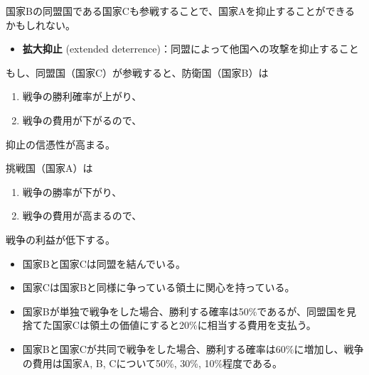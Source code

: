 \documentclass[
  xelatex,
  ja=standard]{bxjsarticle}
\providecommand{\tightlist}{%
  \setlength{\itemsep}{0pt}\setlength{\parskip}{0pt}}\usepackage{longtable,booktabs,array}
\begin{document}
国家Bの同盟国である国家Cも参戦することで、国家Aを抑止することができるかもしれない。

\begin{itemize}
\tightlist
\item
  \textbf{拡大抑止} (extended
  deterrence)：同盟によって他国への攻撃を抑止すること
\end{itemize}

もし、同盟国（国家C）が参戦すると、防衛国（国家B）は

\begin{enumerate}
\def\labelenumi{\arabic{enumi}.}
\tightlist
\item
  戦争の勝利確率が上がり、
\item
  戦争の費用が下がるので、
\end{enumerate}

抑止の信憑性が高まる。

挑戦国（国家A）は

\begin{enumerate}
\def\labelenumi{\arabic{enumi}.}
\tightlist
\item
  戦争の勝率が下がり、
\item
  戦争の費用が高まるので、
\end{enumerate}

戦争の利益が低下する。

\begin{tcolorbox}[enhanced jigsaw, colback=white, leftrule=.75mm, bottomrule=.15mm, opacityback=0, opacitybacktitle=0.6, toptitle=1mm, bottomtitle=1mm, toprule=.15mm, coltitle=black, title=\textcolor{quarto-callout-tip-color}{\faLightbulb}\hspace{0.5em}{同盟国のいる国際危機のシナリオ1}, titlerule=0mm, colbacktitle=quarto-callout-tip-color!10!white, breakable, arc=.35mm, colframe=quarto-callout-tip-color-frame, rightrule=.15mm, left=2mm]

\begin{itemize}
\tightlist
\item
  国家Bと国家Cは同盟を結んでいる。
\item
  国家Cは国家Bと同様に争っている領土に関心を持っている。
\item
  国家Bが単独で戦争をした場合、勝利する確率は50\%であるが、同盟国を見捨てた国家Cは領土の価値にすると20\%に相当する費用を支払う。
\item
  国家Bと国家Cが共同で戦争をした場合、勝利する確率は60\%に増加し、戦争の費用は国家A,
  B, Cについて50\%, 30\%, 10\%程度である。
\end{itemize}

\end{tcolorbox}
\end{document}
